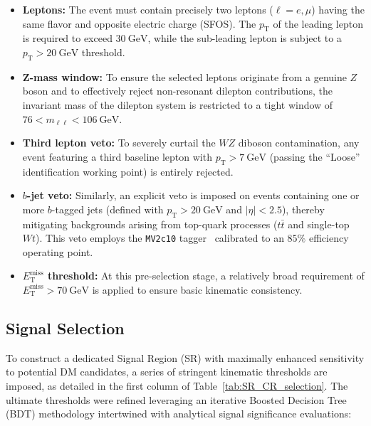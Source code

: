 \begin{itemize}
    \item \textbf{Leptons:} The event must contain precisely two leptons ($\ell = e, \mu$) having the same flavor and opposite electric charge (SFOS). The $p_{\text{T}}$ of the leading lepton is required to exceed $30~\text{GeV}$, while the sub-leading lepton is subject to a $p_{\text{T}} > 20~\text{GeV}$ threshold.
    \item \textbf{Z-mass window:} To ensure the selected leptons originate from a genuine $Z$ boson and to effectively reject non-resonant dilepton contributions, the invariant mass of the dilepton system is restricted to a tight window of $76 < m_{\ell\ell} < 106~\text{GeV}$.
    \item \textbf{Third lepton veto:} To severely curtail the $WZ$ diboson contamination, any event featuring a third baseline lepton with $p_{\text{T}} > 7~\text{GeV}$ (passing the ``Loose'' identification working point) is entirely rejected.
    \item \textbf{$b$-jet veto:} Similarly, an explicit veto is imposed on events containing one or more $b$-tagged jets (defined with $p_{\text{T}} > 20~\text{GeV}$ and $|\eta| < 2.5$), thereby mitigating backgrounds arising from top-quark processes ($t\bar{t}$ and single-top $Wt$). This veto employs the \texttt{MV2c10} tagger~\cite{ATLAS:2019bwq} calibrated to an $85\%$ efficiency operating point.
    \item \textbf{$E_{\text{T}}^{\text{miss}}$ threshold:} At this pre-selection stage, a relatively broad requirement of $E_{\text{T}}^{\text{miss}} > 70~\text{GeV}$ is applied to ensure basic kinematic consistency.
\end{itemize}

\subsection{Signal Selection}
\label{subsec:sr_def}

To construct a dedicated Signal Region (SR) with maximally enhanced sensitivity to potential DM candidates, a series of stringent kinematic thresholds are imposed, as detailed in the first column of Table~\ref{tab:SR_CR_selection}. The ultimate thresholds were refined leveraging an iterative Boosted Decision Tree (BDT) methodology intertwined with analytical signal significance evaluations:

